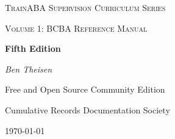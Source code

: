 \begin{titlepage}
	\centering
	{\scshape\LARGE TrainABA Supervision Curriculum Series\par}
	\vspace{1cm}
	{\scshape\Large Volume 1: BCBA Reference Manual\par}
	\vspace{1.5cm}
	{\huge\bfseries Fifth Edition\par}
	\vspace{2cm}
	{\Large\itshape Ben Theisen\par}
	\vfill
	Free and Open Source Community Edition \par   
	Cumulative Records Documentation Society

	\vfill

	{\large \today\par}
\end{titlepage}
